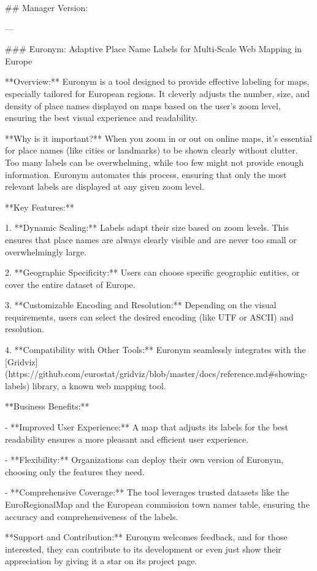 ## Manager Version:

---

### Euronym: Adaptive Place Name Labels for Multi-Scale Web Mapping in Europe

**Overview:**  
Euronym is a tool designed to provide effective labeling for maps, especially tailored for European regions. It cleverly adjusts the number, size, and density of place names displayed on maps based on the user's zoom level, ensuring the best visual experience and readability.

**Why is it important?**  
When you zoom in or out on online maps, it's essential for place names (like cities or landmarks) to be shown clearly without clutter. Too many labels can be overwhelming, while too few might not provide enough information. Euronym automates this process, ensuring that only the most relevant labels are displayed at any given zoom level.

**Key Features:**  

1. **Dynamic Scaling:** Labels adapt their size based on zoom levels. This ensures that place names are always clearly visible and are never too small or overwhelmingly large.
  
2. **Geographic Specificity:** Users can choose specific geographic entities, or cover the entire dataset of Europe. 
  
3. **Customizable Encoding and Resolution:** Depending on the visual requirements, users can select the desired encoding (like UTF or ASCII) and resolution.

4. **Compatibility with Other Tools:** Euronym seamlessly integrates with the [Gridviz](https://github.com/eurostat/gridviz/blob/master/docs/reference.md#showing-labels) library, a known web mapping tool.

**Business Benefits:**  

- **Improved User Experience:** A map that adjusts its labels for the best readability ensures a more pleasant and efficient user experience.
  
- **Flexibility:** Organizations can deploy their own version of Euronym, choosing only the features they need.
  
- **Comprehensive Coverage:** The tool leverages trusted datasets like the EuroRegionalMap and the European commission town names table, ensuring the accuracy and comprehensiveness of the labels.

**Support and Contribution:**  
Euronym welcomes feedback, and for those interested, they can contribute to its development or even just show their appreciation by giving it a star on its project page.

